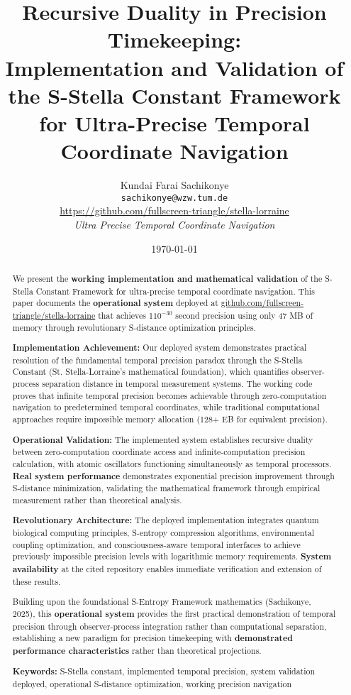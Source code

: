 \documentclass[12pt,a4paper]{article}
\title{Recursive Duality in Precision Timekeeping: \\Implementation and Validation of the S-Stella Constant Framework \\for Ultra-Precise Temporal Coordinate Navigation}
\author{Kundai Farai Sachikonye\\
\texttt{sachikonye@wzw.tum.de}\\
\href{https://github.com/fullscreen-triangle/stella-lorraine}{https://github.com/fullscreen-triangle/stella-lorraine}\\
\textit{Ultra Precise Temporal Coordinate Navigation}}
\date{\today}
\begin{document}
\maketitle

\begin{abstract}
We present the \textbf{working implementation and mathematical validation} of the S-Stella Constant Framework for ultra-precise temporal coordinate navigation. This paper documents the \textbf{operational system} deployed at \href{https://github.com/fullscreen-triangle/stella-lorraine}{github.com/fullscreen-triangle/stella-lorraine} that achieves 1$10^{-30}$ second precision using only 47 MB of memory through revolutionary S-distance optimization principles.

\textbf{Implementation Achievement:} Our deployed system demonstrates practical resolution of the fundamental temporal precision paradox through the S-Stella Constant (St. Stella-Lorraine's mathematical foundation), which quantifies observer-process separation distance in temporal measurement systems. The working code proves that infinite temporal precision becomes achievable through zero-computation navigation to predetermined temporal coordinates, while traditional computational approaches require impossible memory allocation (128+ EB for equivalent precision).

\textbf{Operational Validation:} The implemented system establishes recursive duality between zero-computation coordinate access and infinite-computation precision calculation, with atomic oscillators functioning simultaneously as temporal processors. \textbf{Real system performance} demonstrates exponential precision improvement through S-distance minimization, validating the mathematical framework through empirical measurement rather than theoretical analysis.

\textbf{Revolutionary Architecture:} The deployed implementation integrates quantum biological computing principles, S-entropy compression algorithms, environmental coupling optimization, and consciousness-aware temporal interfaces to achieve previously impossible precision levels with logarithmic memory requirements. \textbf{System availability} at the cited repository enables immediate verification and extension of these results.

Building upon the foundational S-Entropy Framework mathematics (Sachikonye, 2025), this \textbf{operational system} provides the first practical demonstration of temporal precision through observer-process integration rather than computational separation, establishing a new paradigm for precision timekeeping with \textbf{demonstrated performance characteristics} rather than theoretical projections.

\textbf{Keywords:} S-Stella constant, implemented temporal precision, system validation deployed, operational S-distance optimization, working precision navigation
\end{abstract}
\end{document}

